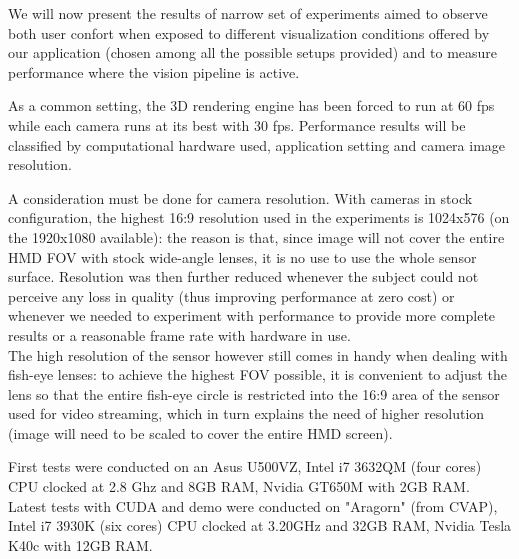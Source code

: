 
We will now present the results of narrow set of experiments aimed to observe both user confort when exposed to different visualization conditions offered by our application (chosen among all the possible setups provided) and to measure performance where the vision pipeline is active.

As a common setting, the 3D rendering engine has been forced to run at 60 fps while each camera runs at its best with 30 fps.  Performance results will be classified by computational hardware used, application setting and camera image resolution.

A consideration must be done for camera resolution. With cameras in stock configuration, the highest 16:9 resolution used in the experiments is 1024x576 (on the 1920x1080 available): the reason is that, since image will not cover the entire HMD FOV with stock wide-angle lenses, it is no use to use the whole sensor surface. Resolution was then further reduced whenever the subject could not perceive any loss in quality (thus improving performance at zero cost) or whenever we needed to experiment with performance to provide more complete results or a reasonable frame rate with hardware in use.\\
The high resolution of the sensor however still comes in handy when dealing with fish-eye lenses: to achieve the highest FOV possible, it is convenient to adjust the lens so that the entire fish-eye circle is restricted into the 16:9 area of the sensor used for video streaming, which in turn explains the need of higher resolution (image will need to be scaled to cover the entire HMD screen).

First tests were conducted on an Asus U500VZ, Intel i7 3632QM (four cores) CPU clocked at 2.8 Ghz and 8GB RAM, Nvidia GT650M with 2GB RAM.
Latest tests with CUDA and demo were conducted on "Aragorn" (from CVAP), Intel i7 3930K (six cores) CPU clocked at 3.20GHz and 32GB RAM, Nvidia Tesla K40c with 12GB RAM.

